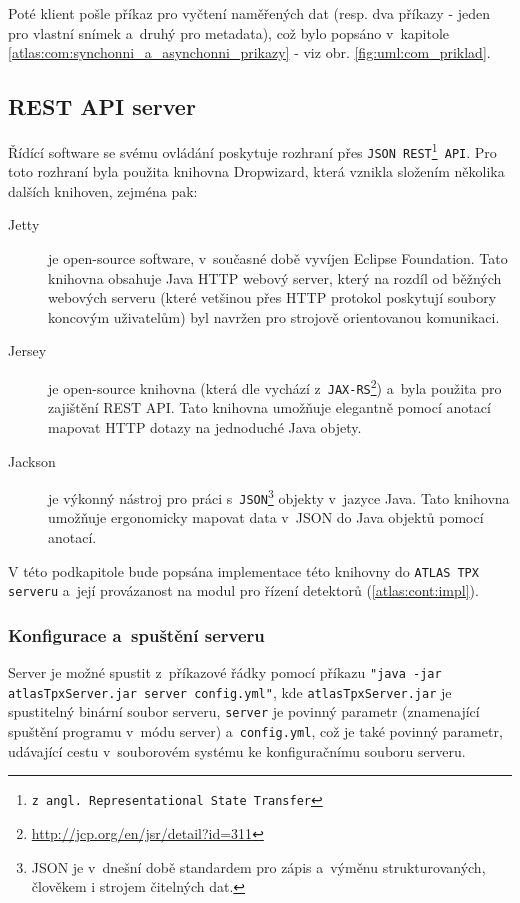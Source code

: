 Poté klient pošle příkaz pro vyčtení naměřených dat (resp. dva příkazy - jeden pro vlastní snímek a~druhý pro metadata), což bylo popsáno v~kapitole \ref{atlas:com:synchonni_a_asynchonni_prikazy} - viz obr. \ref{fig:uml:com_priklad}.

\subsection{REST API server}\label{atlas:cont:api}
Řídící software se svému ovládání poskytuje rozhraní přes \texttt{JSON REST\footnote{z angl. Representational State Transfer} API}. Pro toto rozhraní byla použita knihovna Dropwizard\cite{dropwizard}, která vznikla složením několika dalších knihoven, zejména pak:
\begin{description}
	\item[Jetty] je open-source software, v~současné době vyvíjen Eclipse Foundation. Tato knihovna obsahuje Java HTTP webový server, který na rozdíl od běžných webových serveru (které vetšinou přes HTTP protokol poskytují soubory koncovým uživatelům) byl navržen pro strojově orientovanou komunikaci.
	\item[Jersey] je open-source knihovna (která dle \cite{dropwizard} vychází z~\texttt{JAX-RS}\footnote{\url{http://jcp.org/en/jsr/detail?id=311}}) a~byla použita pro zajištění REST API. Tato knihovna umožňuje elegantně pomocí anotací mapovat HTTP dotazy na jednoduché Java objety.
	\item[Jackson] je výkonný nástroj pro práci s~\texttt{JSON}\footnote{JSON je v~dnešní době standardem pro zápis a~výměnu strukturovaných, člověkem i strojem čitelných dat.} objekty v~jazyce Java. Tato knihovna umožňuje ergonomicky mapovat data v~JSON do Java objektů pomocí anotací.
\end{description}

V této podkapitole bude popsána implementace této knihovny do \texttt{ATLAS TPX serveru} a~její provázanost na modul pro řízení detektorů (\ref{atlas:cont:impl}).

\subsubsection{Konfigurace a~spuštění serveru}\label{atlas:cont:api:conf}
Server je možné spustit z~příkazové řádky pomocí příkazu \texttt{"java -jar atlasTpxServer.jar server config.yml"}, kde \texttt{atlasTpxServer.jar} je spustitelný binární soubor serveru, \texttt{server} je povinný parametr (znamenající spuštění programu v~módu server) a~\texttt{config.yml}, což je také povinný parametr, udávající cestu v~souborovém systému ke konfiguračnímu souboru serveru.

